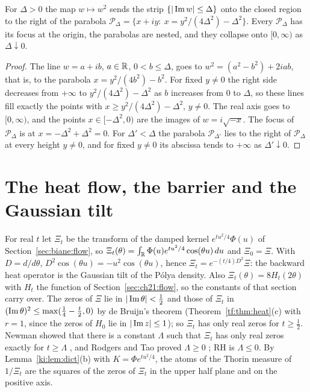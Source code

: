 \begin{lemma}\label{ki:lem:parab}
For $\Delta>0$ the map $w\mapsto w^2$ sends the strip $\{|\operatorname{Im} w|\le\Delta\}$ onto the closed region to the right of the parabola $\mathcal P_\Delta=\{x+iy:\ x=y^2/(4\Delta^2)-\Delta^2\}$. Every $\mathcal P_\Delta$ has its focus at the origin, the parabolas are nested, and they collapse onto $[0,\infty)$ as $\Delta\downarrow0$.
\end{lemma}

\begin{proof}
The line $w=a+ib$, $a\in\mathbb{R}$, $0<b\le\Delta$, goes to $w^2=(a^2-b^2)+2iab$, that is, to the parabola $x=y^2/(4b^2)-b^2$. For fixed $y\ne0$ the right side decreases from $+\infty$ to $y^2/(4\Delta^2)-\Delta^2$ as $b$ increases from $0$ to $\Delta$, so these lines fill exactly the points with $x\ge y^2/(4\Delta^2)-\Delta^2$, $y\ne0$. The real axis goes to $[0,\infty)$, and the points $x\in[-\Delta^2,0)$ are the images of $w=i\sqrt{-x}$. The focus of $\mathcal P_\Delta$ is at $x=-\Delta^2+\Delta^2=0$. For $\Delta'<\Delta$ the parabola $\mathcal P_{\Delta'}$ lies to the right of $\mathcal P_\Delta$ at every height $y\ne0$, and for fixed $y\ne0$ its abscissa tends to $+\infty$ as $\Delta'\downarrow0$.
\end{proof}

\section{The heat flow, the barrier and the Gaussian tilt}\label{ki:sec:flow}

For real $t$ let $\Xi_t$ be the transform of the damped kernel $e^{tu^2/4}\Phi(u)$ of Section~\ref{sec:biane:flow}, so $\Xi_t(\theta)=\int_{\mathbb{R}}\Phi(u)e^{tu^2/4}\cos(\theta u)\,du$ and $\Xi_0=\Xi$. With $D=d/d\theta$, $D^2\cos(\theta u)=-u^2\cos(\theta u)$, hence $\Xi_t=e^{-(t/4)D^2}\Xi$: the backward heat operator is the Gaussian tilt of the P\'olya density. Also $\Xi_t(\theta)=8H_t(2\theta)$ with $H_t$ the function of Section~\ref{sec:ch21:flow}, so the constants of that section carry over. The zeros of $\Xi$ lie in $|\operatorname{Im}\theta|<\tfrac12$ and those of $\Xi_t$ in $(\operatorname{Im}\theta)^2\le\max(\tfrac14-\tfrac t2,0)$ by de Bruijn's theorem \cite[Theorem~13]{deBruijn} (Theorem~\ref{tf:thm:heat}(c) with $r=1$, since the zeros of $H_0$ lie in $|\operatorname{Im} z|\le1$); so $\Xi_t$ has only real zeros for $t\ge\tfrac12$. Newman showed that there is a constant $\Lambda$ such that $\Xi_t$ has only real zeros exactly for $t\ge\Lambda$ \cite{Newman1976}, and Rodgers and Tao proved $\Lambda\ge0$ \cite{RodgersTao}; RH is $\Lambda\le0$. By Lemma~\ref{ki:lem:dict}(b) with $K=\Phi e^{tu^2/4}$, the atoms of the Thorin measure of $1/\Xi_t$ are the squares of the zeros of $\Xi_t$ in the upper half plane and on the positive axis.

